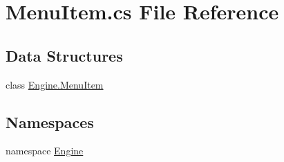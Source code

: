 \hypertarget{a00215}{}\section{Menu\+Item.\+cs File Reference}
\label{a00215}
\subsection*{Data Structures}
\begin{DoxyCompactItemize}
\item 
class \hyperlink{a00578}{Engine.\+Menu\+Item}
\end{DoxyCompactItemize}
\subsection*{Namespaces}
\begin{DoxyCompactItemize}
\item 
namespace \hyperlink{a00240}{Engine}
\end{DoxyCompactItemize}
